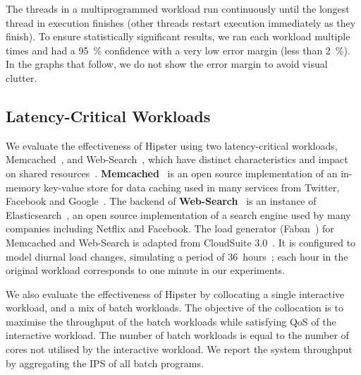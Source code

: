 The threads in a multiprogrammed workload run continuously until the longest thread in
execution finishes (other threads restart execution immediately as they finish).  To
ensure statistically significant results, we ran each workload multiple times and had a
\SI{95}{\percent} confidence with a very low error margin (less than \SI{2}{\percent}).
In the graphs that follow, we do not show the error margin to avoid visual clutter.  





\subsection{Latency-Critical Workloads} 


 We evaluate the effectiveness of Hipster using two latency-critical
workloads, Memcached~\citep{MemcachedHttps://memcached.org/}, and
Web-Search~\citep{Elasticsearchhttps://github.com/elastic/elasticsearch}, which have
distinct characteristics and impact on shared resources~\citep{Lo2015Heracles}.
\textbf{Memcached}~\citep{MemcachedHttps://memcached.org/} is an open source
implementation of an in-memory key-value store for data caching used in many services from
Twitter, Facebook and Google~\citep{199376,
Nishtala2013ScalingFacebook,Atikoglu2012WorkloadStore}.  The backend of
\textbf{Web-Search}~\citep{Barroso2003WebArchitecture, JanapaReddi2010WebCores, 199376} is
an instance of
Elasticsearch~\citep{Elasticsearchhttps://github.com/elastic/elasticsearch}, an open
source implementation of a search engine used by many companies including Netflix and
Facebook.  The load generator (Faban~\citep{FabanHttp://faban.org/}) for Memcached and
Web-Search is adapted from CloudSuite 3.0~\citep{Ferdman2012ClearingClouds}. It is
configured to model diurnal load changes, simulating a period of
36~hours~\citep{Meisner2011PowerServices}; each hour in the original workload corresponds
to one minute in our experiments.

 We also evaluate the effectiveness of Hipster by collocating a single
interactive workload, and a mix of batch workloads. The objective of the collocation is to
maximise the throughput of the batch workloads while satisfying QoS of the interactive
workload. The number of batch workloads is equal to the number of cores not utilised by
the interactive workload. We report the system throughput by aggregating the IPS of all
batch programs.

